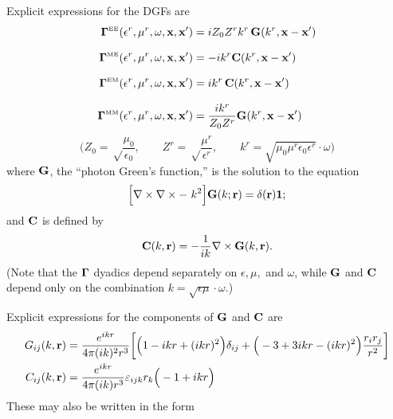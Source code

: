 \documentclass[letterpaper]{article}
\begin{document}
Explicit expressions for the DGFs are 
\begin{align*}
\boldsymbol{\Gamma}^{\hbox{\tiny{EE}}}(\epsilon^r, \mu^r, \omega, \mathbf{x}, \mathbf{x}^\prime)
&=
 iZ_0 Z^r k^r \, \mathbf{G}(k^r, \mathbf{x}-\mathbf{x}^\prime)
\\[8pt]
\boldsymbol{\Gamma}^{\hbox{\tiny{ME}}}(\epsilon^r, \mu^r, \omega, \mathbf{x}, \mathbf{x}^\prime)
&=
 -ik^r \mathbf{C}(k^r, \mathbf{x}-\mathbf{x}^\prime)
\\[8pt]
\boldsymbol{\Gamma}^{\hbox{\tiny{EM}}}(\epsilon^r, \mu^r, \omega, \mathbf{x}, \mathbf{x}^\prime)
&=
 ik^r \, \mathbf{C}(k^r, \mathbf{x}-\mathbf{x}^\prime)
\\[8pt]
\boldsymbol{\Gamma}^{\hbox{\tiny{MM}}}(\epsilon^r, \mu^r, \omega, \mathbf{x}, \mathbf{x}^\prime)
&= \frac{ik^r}{Z_0 Z^r} \mathbf{G}(k^r, \mathbf{x}-\mathbf{x}^\prime)
\end{align*}
$$\bigg(Z_0=\sqrt\frac{\mu_0}{\epsilon_0},
        \qquad
        Z^r=\sqrt\frac{\mu^r}{\epsilon^r}, 
         \qquad
        k^r=\sqrt{\mu_0 \mu^r \epsilon_0 \epsilon^r}\cdot \omega
  \bigg)
$$
where $\mathbf{G}$, the ``photon Green's function,''
is the solution to the equation
\begin{equation}
 \Big[\nabla \times \nabla\times - \,\,k^2 \Big]\mathbf{G}(k; \mathbf{r})
 =\delta(\mathbf{r})\mathbf{1};
 \label{DyadicGFG}
\end{equation}
and $\mathbf{C}$ is defined by  
\begin{equation}
  \mathbf{C}(k, \mathbf{r}) = -\frac{1}{ik} \nabla \times \mathbf{G}(k, \mathbf{r}).
 \label{DyadicGFC}
\end{equation}
%
(Note that the $\boldsymbol{\Gamma}$ dyadics depend separately on $\epsilon,\mu,$ 
and $\omega$, while $\mathbf{G}$ and $\mathbf{C}$ depend only on the 
combination $k=\sqrt{\epsilon\mu}\cdot \omega.$)

Explicit expressions for the components of $\mathbf{G}$ and $\mathbf{C}$ are 
\begin{align*}
G_{ij}(k,\mathbf{r}) 
 &= \frac{e^{ikr}}{4\pi (ik)^2 r^3}
    \bigg[ \Big(1-ikr + (ikr)^2 \Big)\delta_{ij}
          +\Big(-3 + 3ikr - (ikr)^2 \Big)\frac{r_i r_j}{r^2}
    \bigg]
\\
C_{ij}(k,\mathbf{r}) 
 &= \frac{e^{ikr}}{4\pi (ik) r^3} \varepsilon_{ijk} r_k 
    \Big(-1+ikr\Big)
\end{align*}
These may also be written in the form
\end{document}
